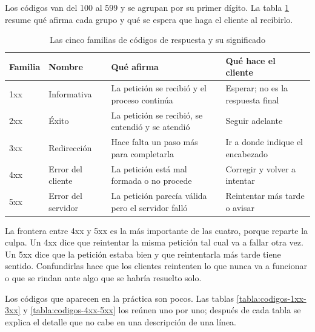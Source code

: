 \documentclass[10pt,a4paper]{article}
\begin{document}
Los códigos van del 100 al 599 y se agrupan por su primer dígito. La tabla \ref{tabla:familias} resume qué afirma cada grupo y qué se espera que haga el cliente al recibirlo.

\begin{table}[H]
	\centering
	\begin{tabular}{p{1.6cm} | p{3.2cm} | p{5.2cm} | p{3.6cm}}\hline \hline
		\textbf{Familia} & \textbf{Nombre} & \textbf{Qué afirma} & \textbf{Qué hace el cliente} \\ \hline \hline
		1xx & Informativa & La petición se recibió y el proceso continúa & Esperar; no es la respuesta final \\ \hline
		2xx & Éxito & La petición se recibió, se entendió y se atendió & Seguir adelante \\ \hline
		3xx & Redirección & Hace falta un paso más para completarla & Ir a donde indique el encabezado \\ \hline
		4xx & Error del cliente & La petición está mal formada o no procede & Corregir y volver a intentar \\ \hline
		5xx & Error del servidor & La petición parecía válida pero el servidor falló & Reintentar más tarde o avisar \\ \hline \hline
	\end{tabular}
	\caption{Las cinco familias de códigos de respuesta y su significado}
	\label{tabla:familias}
\end{table}

La frontera entre 4xx y 5xx es la más importante de las cuatro, porque reparte la culpa. Un 4xx dice que reintentar la misma petición tal cual va a fallar otra vez. Un 5xx dice que la petición estaba bien y que reintentarla más tarde tiene sentido. Confundirlas hace que los clientes reintenten lo que nunca va a funcionar o que se rindan ante algo que se habría resuelto solo.

Los códigos que aparecen en la práctica son pocos. Las tablas \ref{tabla:codigos-1xx-3xx} y \ref{tabla:codigos-4xx-5xx} los reúnen uno por uno; después de cada tabla se explica el detalle que no cabe en una descripción de una línea.
\end{document}
